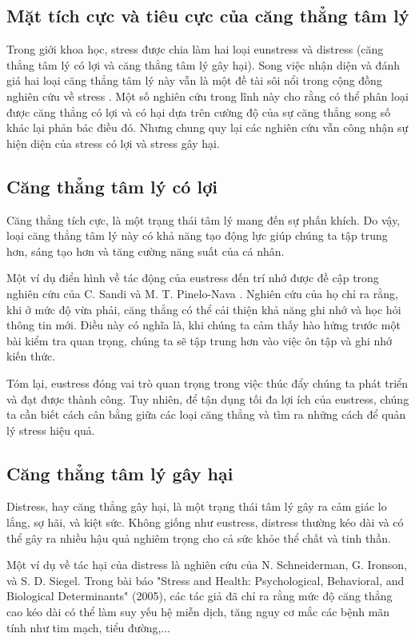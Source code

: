 \subsection{Mặt tích cực và tiêu cực của căng thẳng tâm lý}
Trong giới khoa học, stress được chia làm hai loại eunstress và distress (căng thẳng tâm lý có lợi và căng thẳng tâm lý gây hại). Song việc nhận diện và đánh giá hai loại căng thẳng tâm lý này vẫn là một đề tài sôi nổi trong cộng đồng nghiên cứu về stress \cite{eustress_distress,eustress_distress2,eustress_distress3,eustress_distress4}. Một số nghiên cứu trong lĩnh này cho rằng có thể phân loại được căng thẳng có lợi và có hại dựa trên cường độ của sự căng thẳng song số khác lại phản bác điều đó. Nhưng chung quy lại các nghiên cứu vẫn công nhận sự hiện diện của stress có lợi và stress gây hại.
\subsection{Căng thẳng tâm lý có lợi}
 Căng thẳng tích cực, là một trạng thái tâm lý mang đến sự phấn khích. Do vậy, loại căng thẳng tâm lý này có khả năng tạo động lực giúp chúng ta tập trung hơn, sáng tạo hơn và tăng cường năng suất của cá nhân.

Một ví dụ điển hình về tác động của eustress đến trí nhớ được đề cập trong nghiên cứu của C. Sandi và M. T. Pinelo-Nava \cite{eustress_distress3}. Nghiên cứu của họ chỉ ra rằng, khi ở mức độ vừa phải, căng thẳng có thể cải thiện khả năng ghi nhớ và học hỏi thông tin mới. Điều này có nghĩa là, khi chúng ta cảm thấy hào hứng trước một bài kiểm tra quan trọng, chúng ta sẽ tập trung hơn vào việc ôn tập và ghi nhớ kiến thức.

Tóm lại, eustress đóng vai trò quan trọng trong việc thúc đẩy chúng ta phát triển và đạt được thành công. Tuy nhiên, để tận dụng tối đa lợi ích của eustress, chúng ta cần biết cách cân bằng giữa các loại căng thẳng và tìm ra những cách để quản lý stress hiệu quả.
\subsection{Căng thẳng tâm lý gây hại}
Distress, hay căng thẳng gây hại, là một trạng thái tâm lý gây ra cảm giác lo lắng, sợ hãi, và kiệt sức. Không giống như eustress, distress thường kéo dài và có thể gây ra nhiều hậu quả nghiêm trọng cho cả sức khỏe thể chất và tinh thần.

Một ví dụ về tác hại của distress là nghiên cứu của N. Schneiderman, G. Ironson, và S. D. Siegel\cite{eustress_distress4}. Trong bài báo "Stress and Health: Psychological, Behavioral, and Biological Determinants" (2005), các tác giả đã chỉ ra rằng mức độ căng thẳng cao kéo dài có thể làm suy yếu hệ miễn dịch, tăng nguy cơ mắc các bệnh mãn tính như tim mạch, tiểu đường,... \cite{eustress_distress4}

